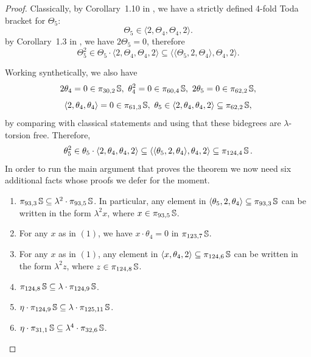 \begin{proof}
Classically, by Corollary~1.10 in \cite{WX}, we have a strictly defined 4-fold Toda bracket for $\Theta_5$:
$$\Theta_5 \in \langle 2, \Theta_4, \Theta_4, 2 \rangle.$$
by Corollary~1.3 in \cite{Xu}, we have $2 \Theta_5 = 0$, therefore
$$\Theta_5^2 \in \Theta_5 \cdot \langle 2, \Theta_4, \Theta_4, 2 \rangle  \subseteq \langle \langle \Theta_5, 2, \Theta_4 \rangle, \Theta_4, 2 \rangle.$$
  
Working synthetically, we also have 
$$2\theta_4 = 0 \in \pi_{30,2}\operatorname{\mathbb{S}}, \ \theta_4^2=0 \in \pi_{60,4}\operatorname{\mathbb{S}}, \ 2\theta_5=0 \in \pi_{62,2}\operatorname{\mathbb{S}},$$
$$\langle 2, \theta_4, \theta_4\rangle = 0 \in \pi_{61,3}\operatorname{\mathbb{S}} , \ \theta_5 \in \langle 2, \theta_4, \theta_4, 2 \rangle \subseteq \pi_{62,2}\operatorname{\mathbb{S}},$$
by comparing with classical statements and using that these bidegrees are $\lambda$-torsion free. Therefore, 
$$\theta_5^2 \in \theta_5 \cdot \langle 2, \theta_4, \theta_4, 2 \rangle  \subseteq \langle \langle \theta_5, 2, \theta_4 \rangle, \theta_4, 2 \rangle \subseteq \pi_{124,4}\operatorname{\mathbb{S}}.$$
In order to run the main argument that proves the theorem we now need six additional facts whose proofs we defer for the moment.

\begin{enumerate}
\item $ \pi_{93,3}\operatorname{\mathbb{S}} \subseteq \lambda^2 \cdot \pi_{93,5}\operatorname{\mathbb{S}} $.
  In particular, any element in $\langle \theta_5, 2, \theta_4 \rangle \subseteq \pi_{93,3}\operatorname{\mathbb{S}}$ can be written in the form $\lambda^2 x$, where $x \in \pi_{93,5}\operatorname{\mathbb{S}}$.\vspace{4pt}
\item For any $x$ as in $(1)$, we have $x \cdot \theta_4 = 0$ in $\pi_{123,7}\operatorname{\mathbb{S}}$.\vspace{4pt}
\item For any $x$ as in $(1)$, any element in $\langle x, \theta_4, 2 \rangle \subseteq \pi_{124,6}\operatorname{\mathbb{S}}$ can be written in the form $\lambda^2 z$, where $z \in \pi_{124, 8}\operatorname{\mathbb{S}}$.\vspace{4pt}
\item $\pi_{124, 8}\operatorname{\mathbb{S}} \subseteq \lambda \cdot \pi_{124, 9}\operatorname{\mathbb{S}}$.\vspace{4pt}
\item $\eta \cdot \pi_{124, 9}\operatorname{\mathbb{S}} \subseteq \lambda \cdot \pi_{125, 11}\operatorname{\mathbb{S}}$.\vspace{4pt}
\item $\eta \cdot \pi_{31, 1}\operatorname{\mathbb{S}} \subseteq \lambda^4 \cdot \pi_{32, 6}\operatorname{\mathbb{S}}$.\vspace{4pt}
\end{enumerate} 


\end{proof}
